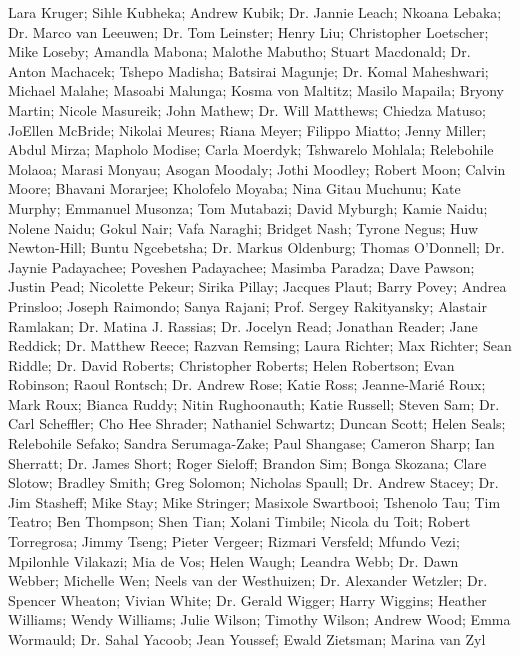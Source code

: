     Lara Kruger;
    Sihle Kubheka;
    Andrew Kubik;
Dr. Jannie Leach;
    Nkoana Lebaka;
Dr. Marco van Leeuwen;
Dr. Tom Leinster;
    Henry Liu;
    Christopher Loetscher;
    Mike Loseby;
    Amandla Mabona;
    Malothe Mabutho;
    Stuart Macdonald;
Dr. Anton Machacek;
    Tshepo Madisha;
    Batsirai Magunje;
Dr. Komal Maheshwari;
    Michael Malahe;
    Masoabi Malunga;
    Kosma von Maltitz;
    Masilo Mapaila;
    Bryony Martin;
    Nicole Masureik;
    John Mathew;
Dr. Will Matthews;
    Chiedza Matuso;
    JoEllen McBride;
    Nikolai Meures;
    Riana Meyer;
    Filippo Miatto;
    Jenny Miller;
    Abdul Mirza;
    Mapholo Modise;
    Carla Moerdyk;
    Tshwarelo Mohlala;
    Relebohile Molaoa;
    Marasi Monyau;
    Asogan Moodaly;
    Jothi Moodley;
    Robert Moon;
    Calvin Moore;
    Bhavani Morarjee;
    Kholofelo Moyaba;
    Nina Gitau Muchunu;
    Kate Murphy;
    Emmanuel Musonza;
    Tom Mutabazi;
    David Myburgh;
    Kamie Naidu;
    Nolene Naidu;
    Gokul Nair;
    Vafa Naraghi;
    Bridget Nash;
    Tyrone Negus;
    Huw Newton-Hill;
    Buntu Ngcebetsha;
Dr. Markus Oldenburg;
    Thomas O’Donnell;
Dr. Jaynie Padayachee;
    Poveshen Padayachee;
    Masimba Paradza;
    Dave Pawson;
    Justin Pead;
    Nicolette Pekeur;
    Sirika Pillay;
    Jacques Plaut;
    Barry Povey;
    Andrea Prinsloo;
    Joseph Raimondo;
    Sanya Rajani;
Prof. Sergey Rakityansky;
    Alastair Ramlakan;
Dr. Matina J. Rassias;
Dr. Jocelyn Read;
    Jonathan Reader;
    Jane Reddick;
Dr. Matthew Reece;
    Razvan Remsing;
    Laura Richter;
    Max Richter;
    Sean Riddle;
Dr. David Roberts;
    Christopher Roberts;
    Helen Robertson;
    Evan Robinson;
    Raoul Rontsch;
Dr. Andrew Rose;
    Katie Ross;
    Jeanne-Marié Roux;
    Mark Roux;
    Bianca Ruddy;
    Nitin Rughoonauth;
    Katie Russell;
    Steven Sam;
Dr. Carl Scheffler;
    Cho Hee Shrader;
    Nathaniel Schwartz;
    Duncan Scott;
    Helen Seals;
    Relebohile Sefako;
    Sandra Serumaga-Zake;
    Paul Shangase;
    Cameron Sharp;
    Ian Sherratt;
Dr. James Short;
    Roger Sieloff;
    Brandon Sim;
    Bonga Skozana;
    Clare Slotow;
    Bradley Smith;
    Greg Solomon;
    Nicholas Spaull;
Dr. Andrew Stacey;
Dr. Jim Stasheff;
    Mike Stay;
    Mike Stringer;
    Masixole Swartbooi;
    Tshenolo Tau;
    Tim Teatro;
    Ben Thompson;
    Shen Tian;
    Xolani Timbile;
    Nicola du Toit;
    Robert Torregrosa;
    Jimmy Tseng;
    Pieter Vergeer;
    Rizmari Versfeld;
    Mfundo Vezi;
    Mpilonhle Vilakazi;
    Mia de Vos;
    Helen Waugh;
    Leandra Webb;
Dr. Dawn Webber;
    Michelle Wen;
    Neels van der Westhuizen;
Dr. Alexander Wetzler;
Dr. Spencer Wheaton;
    Vivian White;
Dr. Gerald Wigger;
    Harry Wiggins;
    Heather Williams;
    Wendy Williams;
    Julie Wilson;
    Timothy Wilson;
    Andrew Wood;
    Emma Wormauld;
Dr. Sahal Yacoob;
    Jean Youssef;
    Ewald Zietsman; 
    Marina van Zyl







